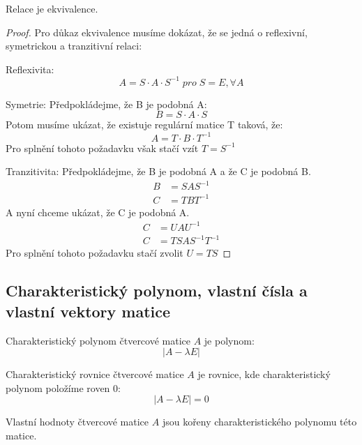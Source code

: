 \begin{theorem}
    Relace  je ekvivalence.
\end{theorem}
\begin{proof}
    Pro důkaz ekvivalence musíme dokázat, že se jedná o reflexivní, symetrickou a tranzitivní
    relaci:

    Reflexivita:
    $$A = S\cdot A\cdot S^{-1}\; pro\; S=E,  \forall A$$

    Symetrie: Předpokládejme, že B je podobná A:
    $$B = S\cdot A \cdot S$$
    Potom musíme ukázat, že existuje regulární matice T taková, že:
    $$A = T \cdot B \cdot T^{-1}$$
    Pro splnění tohoto požadavku však stačí vzít $T = S^{-1}$

    Tranzitivita:
    Předpokládejme, že B je podobná A a že C je podobná B.
    \begin{align*}
        B &= SAS^{-1}\\
        C &= TBT^{-1}
    \end{align*}
    A nyní chceme ukázat, že C je podobná A.
    \begin{align*}
        C &= UAU^{-1}\\
        C &= TSAS^{-1}T^{-1}
    \end{align*}
    Pro splnění tohoto požadavku stačí zvolit $U = TS$
\end{proof}

\subsection{Charakteristický polynom, vlastní čísla a vlastní vektory matice}
\begin{definition}
    Charakteristický polynom čtvercové matice $A$ je polynom:
    $$|A - \lambda E|$$
\end{definition}

\begin{definition}
    Charakteristický rovnice čtvercové matice $A$ je rovnice, kde charakteristický polynom
    položíme roven 0:
    $$|A - \lambda E| = 0$$
\end{definition}

\begin{definition}
    Vlastní hodnoty čtvercové matice $A$ jsou kořeny charakteristického polynomu této matice.
\end{definition}

